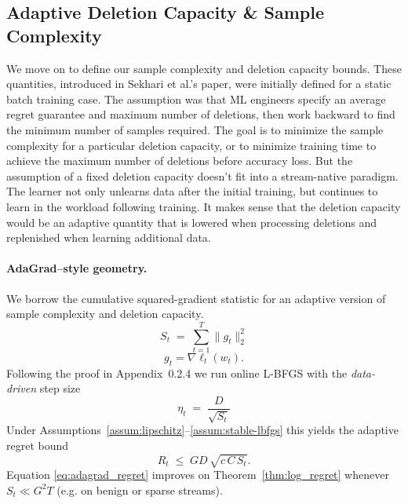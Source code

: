 \documentclass{article}
\theoremstyle{ssltheorem}
\begin{document}
\subsection{Adaptive Deletion Capacity \& Sample Complexity}
\label{subsec:adaptive_capacity}

We move on to define our sample complexity and deletion capacity bounds.
These quantities, introduced in Sekhari et al.'s paper, were initially defined for a static batch training case.
The assumption was that ML engineers specify an average regret guarantee and maximum number of deletions, then work backward to find the minimum number of samples required.
The goal is to minimize the sample complexity for a particular deletion capacity, or to minimize training time to achieve the maximum number of deletions before accuracy loss.
But the assumption of a fixed deletion capacity doesn't fit into a stream-native paradigm.
The learner not only unlearns data after the initial training, but continues to learn in the workload following training.
It makes sense that the deletion capacity would be an adaptive quantity that is lowered when processing deletions and replenished when learning additional data.
\paragraph{AdaGrad–style geometry.} We borrow the cumulative squared-gradient statistic for an adaptive version of sample complexity and deletion capacity.
$$
  S_{t} \;=\;\sum_{t=1}^{T}\lVert g_{t}\rVert_2^{2}
$$
$$
  g_{t} = \nabla\ell_{t}(w_{t}).
$$
Following the proof in Appendix~0.2.4 we run online L-BFGS with the
\emph{data-driven} step size
$$
  \eta_{t} \;=\;\dfrac{D}{\sqrt{S_{t}}}
$$
Under Assumptions~\ref{assum:lipschitz}–\ref{assum:stable-lbfgs} this yields the
adaptive regret bound
\begin{equation}
  R_{t}
  \;\le\;
G D\,\sqrt{c\,C\,S_{t}}.
  \label{eq:adagrad_regret}
\end{equation}
Equation \eqref{eq:adagrad_regret} improves on
Theorem~\ref{thm:log_regret} whenever
\(S_{t}\ll G^{2}T\) (e.g. on benign or sparse streams).
\end{document}
